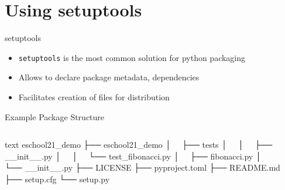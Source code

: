 \section{Using setuptools}

\begin{frame}[c]{setuptools}
  \begin{itemize}
    \item \texttt{setuptools} is the most common solution for python packaging
    \item Allows to declare package metadata, dependencies
    \item Facilitates creation of files for distribution
  \end{itemize}
\end{frame}
\begin{frame}[c, fragile]{Example Package Structure}
  \begin{columns}[onlytextwidth, c]%
    \begin{column}{0.44\textwidth}%
      \begin{code}{text}
        eschool21_demo
        ├── eschool21_demo
        │   ├── tests
        │   │   ├── __init__.py
        │   │   └── test_fibonacci.py
        │   ├── fibonacci.py
        │   └── __init__.py
        ├── LICENSE
        ├── pyproject.toml
        ├── README.md
        ├── setup.cfg
        └── setup.py
      \end{code}
    \end{column}%
    \hfill%
    \begin{column}{0.55\textwidth}%
    \end{column}%
  \end{columns}%
\end{frame}

